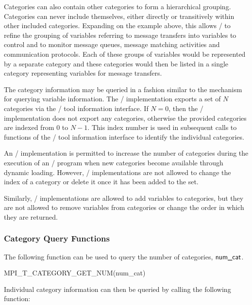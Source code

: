 Categories can also contain other categories to form a hierarchical
grouping.  Categories can never include themselves, either directly or
transitively within other included categories.  Expanding on the example
above, this allows \MPI/ to refine the grouping of variables referring to
message transfers into variables to control and to monitor message queues,
message matching activities and communication protocols.  Each of these
groups of variables would be represented by a separate category and these
categories would then be listed in a single category representing variables
for message transfers.

The category information may be queried in a fashion similar to the
mechanism for querying variable information.  The \MPI/ implementation
exports a set of $N$ categories via the \MPI/ tool information interface.
If $N=0$, then the \MPI/ implementation does not export any categories,
otherwise the provided categories are indexed from $0$ to $N-1$.  This
index number is used in subsequent calls to functions of the \MPI/ tool
information interface to identify the individual categories.

An \MPI/ implementation is permitted to increase the number of categories
during the execution of an \MPI/ program when new categories become
available through dynamic loading.  However, \MPI/ implementations are not
allowed to change the index of a category or delete it once it has been
added to the set.

Similarly, \MPI/ implementations are allowed to add variables to
categories, but they are not allowed to remove variables from categories or
change the order in which they are returned.

\subsubsection{Category Query Functions}

The following function can be used to query the number of categories, $\mpiarg{num\_cat}$.

\begin{funcdef}{MPI\_T\_CATEGORY\_GET\_NUM}{(\mbox{num\_cat})}
\end{funcdef}

Individual category information can then be queried by calling the
following function:

